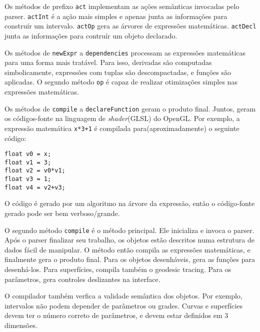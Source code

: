 Os métodos de prefixo \texttt{act} implementam as
ações semânticas invocadas pelo parser.
\texttt{actInt} é a ação mais simples e apenas junta as informações
para construír um intervalo.
\texttt{actOp} gera as árvores de expressões matemáticas.
\texttt{actDecl} junta as informações para contruír um objeto declarado.

Os métodos de \texttt{newExpr} a \texttt{dependencies} processam
as expressões matemáticas para uma forma mais tratável.
Para isso, derivadas são computadas simbolicamente, expressões com tuplas
são descompactadas, e funções são aplicadas.
O segundo método \texttt{op} é capaz de realizar otimizações simples
 nas expressões matemáticas.

Os métodos de \texttt{compile} a \texttt{declareFunction} geram o produto final.
Juntos, geram os códigos-fonte na linguagem de \textit{shader}(GLSL) do OpenGL.
Por exemplo, a expressão matemática \texttt{x*3+1} é
compilada para(aproximadamente) o seguinte código:

\begin{lstlisting}
float v0 = x;
float v1 = 3;
float v2 = v0*v1;
float v3 = 1;
float v4 = v2+v3;
\end{lstlisting}

O código é gerado por um algoritmo na árvore da expressão,
então o código-fonte gerado pode ser bem verboso/grande.

O segundo método \texttt{compile} é o método principal.
Ele inicializa e invoca o parser.
Após o parser finalizar seu trabalho, os objetos estão descritos
numa estrutura de dados fácil de manipular.
O método então compila as expressões matemáticas, e finalmente gera o produto final.
Para os objetos desenháveis, gera as funções para desenhá-los.
Para superfícies, compila também o geodesic tracing.
Para os parâmetros, gera controles deslizantes na interface.

O compilador também verfica a validade semântica dos objetos.
Por exemplo, intervalos não podem depender de parâmetros ou grades.
Curvas e superfícies devem ter o número correto de parâmetros, e devem estar
definidos em 3 dimensões.
